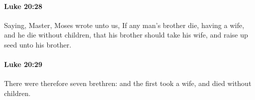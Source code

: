 		\paragraph{Luke 20:28} %
			\label{LUKE-20-28}

			Saying, Master, Moses wrote unto us, If any man's brother die, having a wife, and he die without children, that his brother should take his wife, and raise up seed unto his brother.

			\begin{framed}
			\scriptsize
				\begin{compactdesc}
					\item[SBLG] 
				\end{compactdesc}
			\end{framed}

		\paragraph{Luke 20:29} %
			\label{LUKE-20-29}

			There were therefore seven brethren: and the first took a wife, and died without children.

